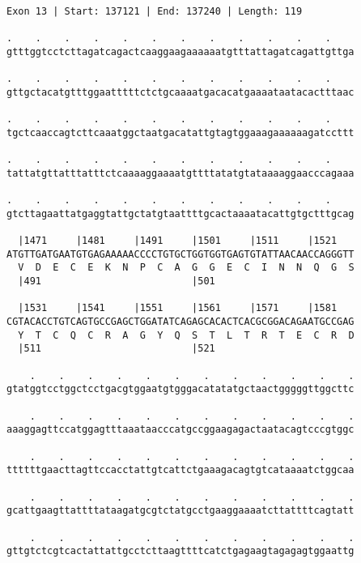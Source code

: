 \documentclass{article}
\begin{document}
\begin{Verbatim}
Exon 13 | Start: 137121 | End: 137240 | Length: 119
 
.    .    .    .    .    .    .    .    .    .    .    .    
gtttggtcctcttagatcagactcaaggaagaaaaaatgtttattagatcagattgttga
  
.    .    .    .    .    .    .    .    .    .    .    .    
gttgctacatgtttggaatttttctctgcaaaatgacacatgaaaataatacactttaac
  
.    .    .    .    .    .    .    .    .    .    .    .    
tgctcaaccagtcttcaaatggctaatgacatattgtagtggaaagaaaaaagatccttt
  
.    .    .    .    .    .    .    .    .    .    .    .    
tattatgttatttatttctcaaaaggaaaatgttttatatgtataaaaggaacccagaaa
  
.    .    .    .    .    .    .    .    .    .    .    .    
gtcttagaattatgaggtattgctatgtaattttgcactaaaatacattgtgctttgcag
  
  |1471     |1481     |1491     |1501     |1511     |1521   
ATGTTGATGAATGTGAGAAAAACCCCTGTGCTGGTGGTGAGTGTATTAACAACCAGGGTT
  V  D  E  C  E  K  N  P  C  A  G  G  E  C  I  N  N  Q  G  S
  |491                          |501                        
  
  |1531     |1541     |1551     |1561     |1571     |1581   
CGTACACCTGTCAGTGCCGAGCTGGATATCAGAGCACACTCACGCGGACAGAATGCCGAG
  Y  T  C  Q  C  R  A  G  Y  Q  S  T  L  T  R  T  E  C  R  D
  |511                          |521                        
  
    .    .    .    .    .    .    .    .    .    .    .    .
gtatggtcctggctcctgacgtggaatgtgggacatatatgctaactgggggttggcttc
  
    .    .    .    .    .    .    .    .    .    .    .    .
aaaggagttccatggagtttaaataacccatgccggaagagactaatacagtcccgtggc
  
    .    .    .    .    .    .    .    .    .    .    .    .
ttttttgaacttagttccacctattgtcattctgaaagacagtgtcataaaatctggcaa
  
    .    .    .    .    .    .    .    .    .    .    .    .
gcattgaagttattttataagatgcgtctatgcctgaaggaaaatcttattttcagtatt
  
    .    .    .    .    .    .    .    .    .    .    .    .
gttgtctcgtcactattattgcctcttaagttttcatctgagaagtagagagtggaattg
\end{Verbatim}
\newpage
\end{document}
